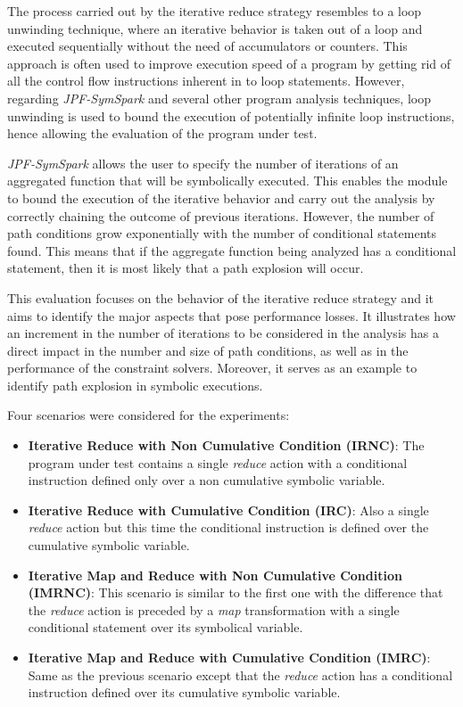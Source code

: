 
The process carried out by the iterative reduce strategy resembles to a loop unwinding technique, where an iterative behavior is taken out of a loop and executed sequentially without the need of accumulators or counters. This approach is often used to improve execution speed of a program by getting rid of all the control flow instructions inherent in to loop statements. However, regarding \textit{JPF-SymSpark} and several other program analysis techniques, loop unwinding is used to bound the execution of potentially infinite loop instructions, hence allowing the evaluation of the program under test.

\textit{JPF-SymSpark} allows the user to specify the number of iterations of an aggregated function that will be symbolically executed. This enables the module to bound the execution of the iterative behavior and carry out the analysis by correctly chaining the outcome of previous iterations. However, the number of path conditions grow exponentially with the number of conditional statements found. This means that if the aggregate function being analyzed has a conditional statement, then it is most likely that a path explosion will occur.

This evaluation focuses on the behavior of the iterative reduce strategy and it aims to identify the major aspects that pose performance losses. It illustrates how an increment in the number of iterations to be considered in the analysis has a direct impact in the number and size of path conditions, as well as in the performance of the constraint solvers. Moreover, it serves as an example to identify path explosion in symbolic executions.


Four scenarios were considered for the experiments:

\begin{itemize}
	\item \textbf{Iterative Reduce with Non Cumulative Condition (IRNC)}: The program under test contains a single \textit{reduce} action with a conditional instruction defined only over a non cumulative symbolic variable.
	\item \textbf{Iterative Reduce with Cumulative Condition (IRC)}: Also a single \textit{reduce} action but this time the conditional instruction is defined over the cumulative symbolic variable.
	\item \textbf{Iterative Map and Reduce with Non Cumulative Condition (IMRNC)}: This scenario is similar to the first one with the difference that the \textit{reduce} action is preceded by a \textit{map} transformation with a single conditional statement over its symbolical variable.
	\item \textbf{Iterative Map and Reduce with Cumulative Condition (IMRC)}: Same as the previous scenario except that the \textit{reduce} action has a conditional instruction defined over its cumulative symbolic variable.
\end{itemize}

